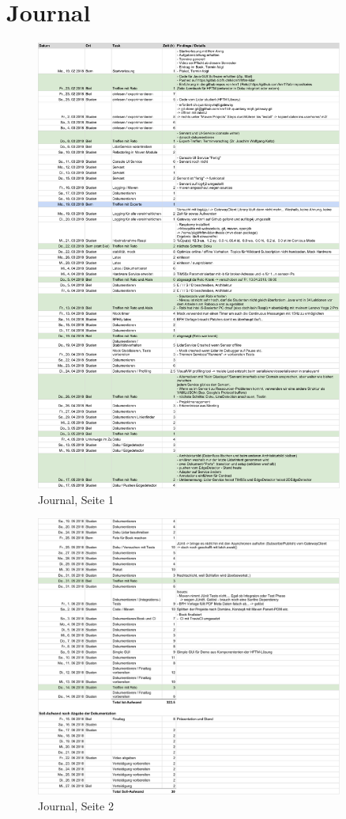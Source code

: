 \section{Journal}
\begin{figure}[H]
	\centering
	\includegraphics[width=0.9\textwidth]{img/journal1.pdf}
	\caption{Journal, Seite 1}
	\label{fig:journal1}
\end{figure}
\begin{figure}[H]
	\centering
	\includegraphics[width=0.9\textwidth]{img/journal2.pdf}
	\caption{Journal, Seite 2}
	\label{fig:journal2}
\end{figure}
